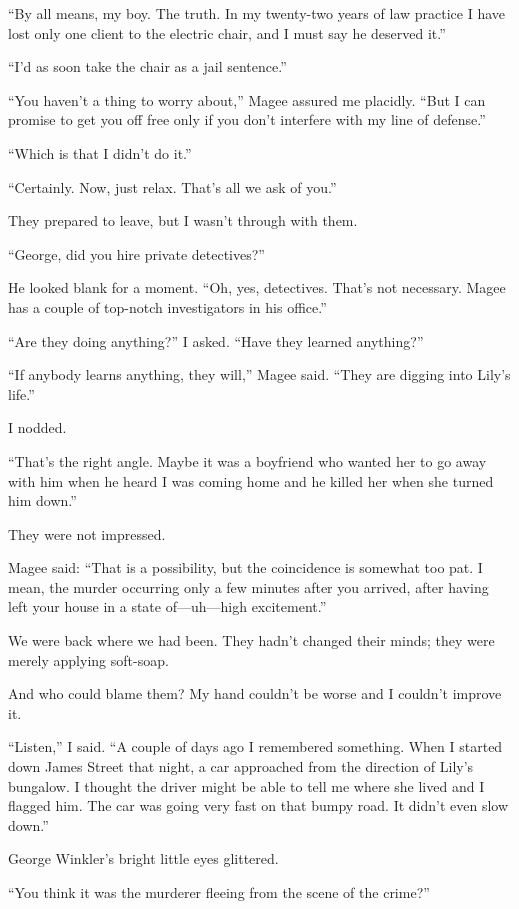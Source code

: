 \documentclass{novel}
\begin{document}
“By all means, my boy. The truth. In my twenty-two years of law practice I have lost only one client to the electric chair, and I must say he deserved it.”

“I’d as soon take the chair as a jail sentence.”

“You haven’t a thing to worry about,” Magee assured me placidly. “But I can promise to get you off free only if you don’t interfere with my line of defense.”

“Which is that I didn’t do it.”

“Certainly. Now, just relax. That’s all we ask of you.”

They prepared to leave, but I wasn’t through with them.

“George, did you hire private detectives?”

He looked blank for a moment. “Oh, yes, detectives. That’s not necessary. Magee has a couple of top-notch investigators in his office.”

“Are they doing anything?” I asked. “Have they learned anything?”

“If anybody learns anything, they will,” Magee said. “They are digging into Lily’s life.”

I nodded.

“That’s the right angle. Maybe it was a boyfriend who wanted her to go away with him when he heard I was coming home and he killed her when she turned him down.”

They were not impressed.

Magee said: “That is a possibility, but the coincidence is somewhat too pat. I mean, the murder occurring only a few minutes after you arrived, after having left your house in a state of—uh—high excitement.”

We were back where we had been. They hadn’t changed their minds; they were merely applying soft-soap. 

And who could blame them? My hand couldn’t be worse and I couldn’t improve it.

“Listen,” I said. “A couple of days ago I remembered something. When I started down James Street that night, a car approached from the direction of Lily’s bungalow. I thought the driver might be able to tell me where she lived and I flagged him. The car was going very fast on that bumpy road. It didn’t even slow down.”

George Winkler’s bright little eyes glittered. 

“You think it was the murderer fleeing from the scene of the crime?”
\end{document}
